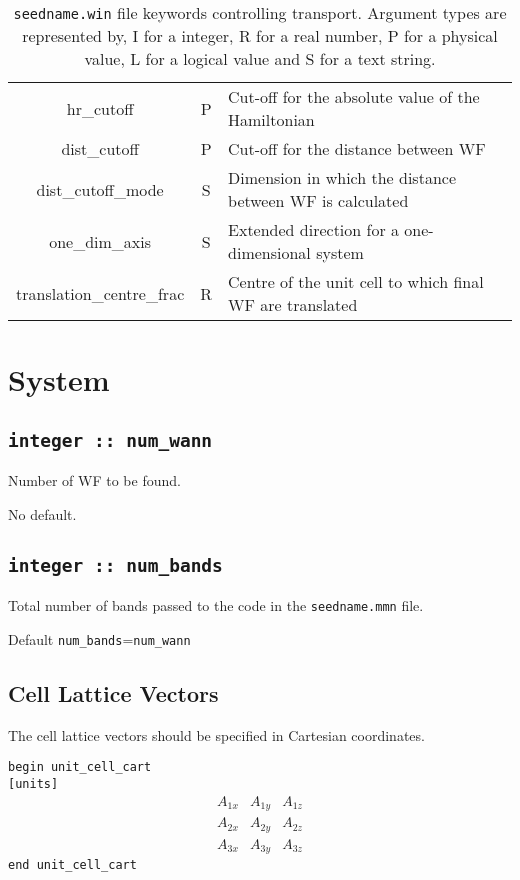 \begin{table}
\begin{center}
\begin{tabular}{|c|c|p{6cm}|}
{\sc hr\_cutoff} & P &  Cut-off for the absolute value of the Hamiltonian \\
{\sc dist\_cutoff} & P & Cut-off for the distance between WF \\
{\sc dist\_cutoff\_mode} & S & Dimension in which the distance between WF
is calculated \\
{\sc one\_dim\_axis} & S &  Extended direction for a one-dimensional system \\
{\sc translation\_centre\_frac } & R & Centre of the unit cell to which
final WF are translated \\ 
\hline
\end{tabular}
\caption[Parameter file keywords controlling transport.]
{{\tt seedname.win} file keywords controlling transport. Argument types
are represented by, I for a integer, R for a real number, P for a
physical value, L for a logical value and S for a text string.}
\label{parameter_keywords7}
\end{center}
\end{table}

\clearpage


\section{System}

\subsection[num\_wann]{\tt integer :: num\_wann}
Number of WF to be found.

No default.

\subsection[num\_bands]{\tt integer :: num\_bands} 

Total number of bands passed to the code in the {\tt seedname.mmn} file.

Default \verb#num_bands#=\verb#num_wann#

\subsection[Cell Lattice Vectors]{Cell Lattice Vectors}

The cell lattice vectors should be specified in Cartesian coordinates.


\noindent \verb#begin unit_cell_cart# \\
\verb#[units]#
$$
\begin{array}{ccc}
A_{1x} & A_{1y} & A_{1z} \\
A_{2x} & A_{2y} & A_{2z} \\
A_{3x} & A_{3y} & A_{3z}
\end{array}
$$
\verb#end unit_cell_cart#

